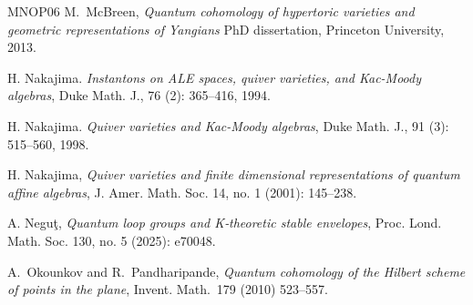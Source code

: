 \documentclass[10pt]{amsart}
\theoremstyle{definition}
\numberwithin{equation}{section}
\begin{document}
\begin{thebibliography}{MNOP06}
 M.~McBreen, \textit{Quantum cohomology of hypertoric varieties and geometric representations of Yangians} PhD dissertation, Princeton University, 2013.


H. Nakajima. \emph{Instantons on ALE spaces, quiver varieties, and Kac-Moody algebras}, Duke Math. J., 76 (2): 365--416, 1994.

H. Nakajima. \emph{Quiver varieties and Kac-Moody algebras}, Duke Math. J., 91 (3): 515--560, 1998.

 H. Nakajima, \textit{Quiver varieties and finite dimensional representations of quantum affine algebras}, 
J. Amer. Math. Soc. 14, no. 1 (2001): 145--238.




 A. Negu\c{t}, \textit{Quantum loop groups and K‐theoretic stable envelopes}, Proc. Lond. Math. Soc. 130, no. 5 (2025): e70048.






A.~Okounkov and R.~Pandharipande, \textit{Quantum cohomology of the Hilbert scheme of points in the plane}, Invent. Math.~179 (2010) 523--557.









\end{thebibliography}
\end{document}
